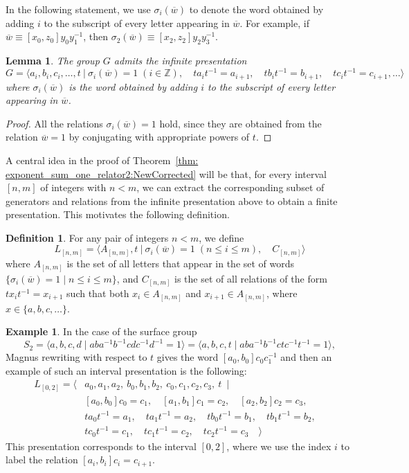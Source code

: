 \documentclass[11pt]{amsart}
\newcommand{\Gpres}[2]{\bigl\langle #1\:|\:#2 \bigr\rangle}
\theoremstyle{plain}
\newtheorem{lemma}[theorem]{Lemma}
\theoremstyle{definition}
\newtheorem{mydef}[theorem]{Definition}
\newtheorem{example}[theorem]{Example}
\begin{document}
In the following statement, we use $\sigma_i(\overline{w})$ to denote the word obtained by adding $i$ to the subscript of every letter appearing in $\overline{w}$. For example, if $\overline{w} \equiv [x_0, z_0]y_0 y_1^{-1}$, then $\sigma_2(\overline{w}) \equiv [x_2, z_2]y_2y_3^{-1
 }$.

\begin{lemma}\label{lem:Gpres}
The group $G$ admits the infinite presentation
\[
G = \Gpres{a_i, b_i, c_i, \ldots, t}{
\sigma_i(\overline{w}) = 1 \; (i \in \mathbb{Z}), \quad
t a_i t^{-1} = a_{i+1}, \quad
t b_i t^{-1} = b_{i+1}, \quad
t c_i t^{-1} = c_{i+1}, \ldots}
\]
where $\sigma_i(\overline{w})$ is the word obtained by adding $i$ to the subscript of every letter appearing in $\overline{w}$.
\end{lemma}

\begin{proof}
All the relations $\sigma_i(\overline{w}) = 1$ hold, since they are obtained from the relation $\overline{w} = 1$ by conjugating with appropriate powers of $t$.
\end{proof}

A central idea in the proof of Theorem~\ref{thm: exponent_sum_one_relator2:NewCorrected} will be that, for every interval $[n, m]$ of integers with $n < m$, we can extract the corresponding subset of generators and relations from the infinite presentation above to obtain a finite presentation. This motivates the following definition.

\begin{mydef}
For any pair of integers $n < m$, we define
\[
L_{[n,m]} = \Gpres{A_{[n,m]}, t }{
\sigma_i(\overline{w}) = 1 \; (n \leq i \leq m), \quad C_{[n,m]} }
\]
where $A_{[n,m]}$ is the set of all letters that appear in the set of words $\{ \sigma_i(\overline{w}) = 1 \mid n \leq i \leq m \}$, and $C_{[n,m]}$ is the set of all relations of the form $t x_i t^{-1} = x_{i+1}$ such that both $x_i \in A_{[n,m]}$ and $x_{i+1} \in A_{[n,m]}$, where $x \in \{a, b, c, \ldots\}$.
\end{mydef}

\begin{example}
In the case of the surface group
\[
  S_2 =
  \langle a,b,c,d \mid aba^{-1}b^{-1}cdc^{-1}d^{-1}=1 \rangle =
  \langle a,b,c,t \mid aba^{-1}b^{-1}ctc^{-1}t^{-1}=1 \rangle,
\]
Magnus rewriting with respect to $t$ gives the word $[a_0,b_0]c_0c_1^{-1}$ and then an example of such an interval presentation is the following:
\begin{align*}
L_{[0,2]} = \bigl\langle
& a_0, a_1, a_2,\ 
b_0, b_1, b_2,\ 
c_0, c_1, c_2, c_3, \ t \ \mid \ \\
& [a_0, b_0]c_0 = c_1,\quad 
[a_1, b_1]c_1 = c_2,\quad 
[a_2, b_2]c_2 = c_3,\quad \\
& ta_0t^{-1} = a_1,\quad 
ta_1t^{-1} = a_2,\quad 
tb_0t^{-1} = b_1,\quad 
tb_1t^{-1} = b_2,\quad \\ 
& tc_0t^{-1} = c_1,\quad 
tc_1t^{-1} = c_2, \quad  
tc_2t^{-1} = c_3 \quad  
\bigr\rangle
\end{align*}
This presentation corresponds to the interval $[0,2]$, where we use the index $i$ to label the relation $[a_i, b_i]c_i = c_{i+1}$.  
\end{example}
\end{document}
